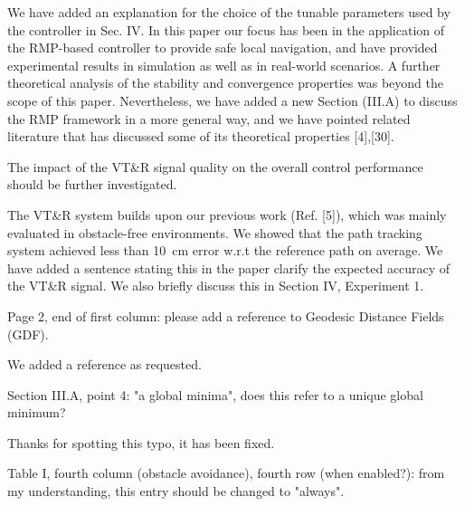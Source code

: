 \documentclass[a4paper,11pt]{article}
\begin{document}
\begin{outline}[enumerate]
	\1 We have added an explanation for the choice of the tunable parameters 
	used by the controller in Sec. IV.
	\1 In this paper our focus has been in the application of the 
	RMP-based controller to provide safe local navigation, and have provided 
	experimental results in simulation as well as in real-world scenarios. A 
	further theoretical analysis of the stability and convergence properties 
	was beyond the scope of this paper.
	\1 Nevertheless, we have added a new Section (III.A) to discuss the RMP 
	framework in a more general way, and we have pointed related literature 
	that has discussed  some of its theoretical properties [4],[30].
\end{outline}

\begin{displayquote}
	The impact of the VT\&R signal quality on the overall control
	performance should be further investigated.
\end{displayquote}

\begin{outline}[enumerate]
	\1 The VT\&R system builds upon our previous work (Ref. [5]), which was 
	mainly evaluated in obstacle-free environments. We showed 
	that the path tracking system achieved less than \SI{10}{\centi\meter} 
	error w.r.t the reference path on average.
	\1 We have added a sentence stating this in the paper clarify the expected 
	accuracy of the VT\&R signal.
	\1 We also briefly discuss this in Section IV, Experiment 1.
\end{outline}

\begin{displayquote}
	Page 2, end of first column: please add a reference to Geodesic
	Distance Fields (GDF).
\end{displayquote}

We added a reference as requested.

\begin{displayquote}
	Section III.A, point 4: "a global minima", does this refer to a
	unique global minimum?
\end{displayquote}

Thanks for spotting this typo, it has been fixed.

\begin{displayquote}
	Table I, fourth column (obstacle avoidance), fourth row (when
	enabled?): from my understanding, this entry should be changed to
	"always".
\end{displayquote}
\end{document}
